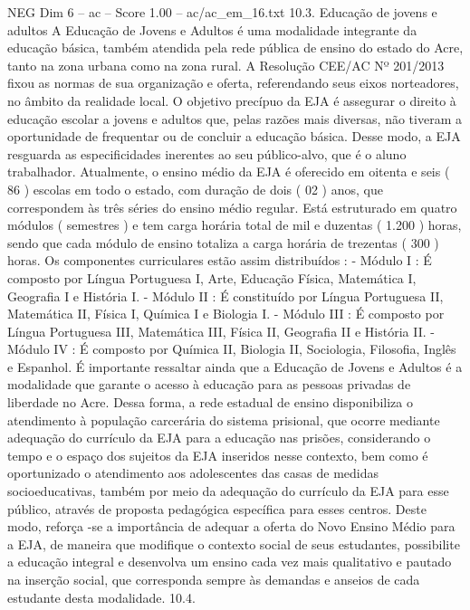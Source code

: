\begin{textsample}{NEG Dim 6 – ac – Score 1.00 – ac/ac\_em\_16.txt}  \label{ex:f6_neg_138}
10.3.
Educação de jovens e adultos A Educação de Jovens e Adultos é uma modalidade integrante da educação básica, também atendida pela rede pública de ensino do estado do Acre, tanto na zona urbana como na zona rural.
A Resolução CEE/AC Nº 201/2013 fixou as normas de sua organização e oferta, referendando seus eixos norteadores, no âmbito da realidade local.
O objetivo precípuo da EJA é assegurar o direito à educação escolar a jovens e adultos que, pelas razões mais diversas, não tiveram a oportunidade de frequentar ou de concluir a educação básica.
Desse modo, a EJA resguarda as especificidades inerentes ao seu público-alvo, que é o aluno trabalhador.
Atualmente, o ensino médio da EJA é oferecido em oitenta e seis ( 86 ) escolas em todo o estado, com duração de dois ( 02 ) anos, que correspondem às três séries do ensino médio regular.
Está estruturado em quatro módulos ( semestres ) e tem carga horária total de mil e duzentas ( 1.200 ) horas, sendo que cada módulo de ensino totaliza a carga horária de trezentas ( 300 ) horas.
Os componentes curriculares estão assim distribuídos : - Módulo I : É composto por Língua Portuguesa I, Arte, Educação Física, Matemática I, Geografia I e História I. - Módulo II : É constituído por Língua Portuguesa II, Matemática II, Física I, Química I e Biologia I. - Módulo III : É composto por Língua Portuguesa III, Matemática III, Física II, Geografia II e História II. - Módulo IV : É composto por Química II, Biologia II, Sociologia, Filosofia, Inglês e Espanhol.
É importante ressaltar ainda que a Educação de Jovens e Adultos é a modalidade que garante o acesso à educação para as pessoas privadas de liberdade no Acre.
Dessa forma, a rede estadual de ensino disponibiliza o atendimento à população carcerária do sistema prisional, que ocorre mediante adequação do currículo da EJA para a educação nas prisões, considerando o tempo e o espaço dos sujeitos da EJA inseridos nesse contexto, bem como é oportunizado o atendimento aos adolescentes das casas de medidas socioeducativas, também por meio da adequação do currículo da EJA para esse público, através de proposta pedagógica específica para esses centros.
Deste modo, reforça -se a importância de adequar a oferta do Novo Ensino Médio para a EJA, de maneira que modifique o contexto social de seus estudantes, possibilite a educação integral e desenvolva um ensino cada vez mais qualitativo e pautado na inserção social, que corresponda sempre às demandas e anseios de cada estudante desta modalidade. 10.4.

\end{textsample}
